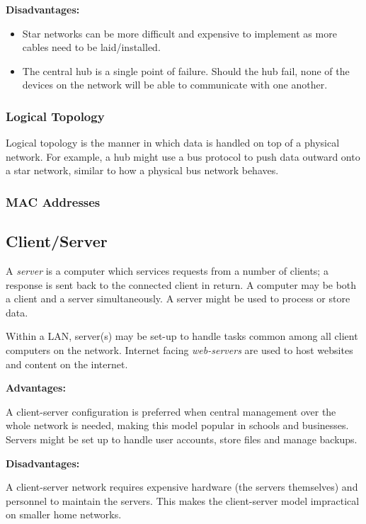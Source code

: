\documentclass[9pt]{article}
\begin{document}
\textbf{Disadvantages:}

\begin{itemize}
\item Star networks can be more difficult and expensive to implement as more cables need to be laid/installed.
\item The central hub is a single point of failure. Should the hub fail, none of the devices on the network will be able to communicate with one another.
\end{itemize}

\subsubsection{Logical Topology}
\label{sec:org71dcedf}

Logical topology is the manner in which data is handled on top of a physical network. For example, a hub might use a bus protocol to push data outward onto a star network, similar to how a physical bus network behaves.

\subsubsection{MAC Addresses}
\label{sec:org12d79d9}
\subsection{Client/Server}
\label{sec:org3f77027}

A \emph{server} is a computer which services requests from a number of clients; a response is sent back to the connected client in return. A computer may be both a client and a server simultaneously. A server might be used to process or store data.

Within a LAN, server(s) may be set-up to handle tasks common among all client computers on the network. Internet facing \emph{web-servers} are used to host websites and content on the internet.

\textbf{Advantages:}

A client-server configuration is preferred when central management over the whole network is needed, making this model popular in schools and businesses. Servers might be set up to handle user accounts, store files and manage backups.

\textbf{Disadvantages:}

A client-server network requires expensive hardware (the servers themselves) and personnel to maintain the servers. This makes the client-server model impractical on smaller home networks.
\end{document}
